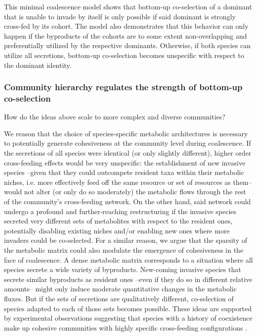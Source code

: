\documentclass[a4paper,10pt]{article}
\begin{document}
This minimal coalescence model shows that
bottom-up co-selection of a dominant that is unable to invade by itself
is only possible if said dominant is strongly cross-fed by its cohort.
The model also demonstrates that this behavior can only happen
if the byproducts of the cohorts are to some extent non-overlapping
and preferentially utilized by the respective dominants.
Otherwise, if both species can utilize all secretions, bottom-up
co-selection becomes unspecific with respect to the dominant identity.

\subsubsection*{Community hierarchy regulates the strength of bottom-up co-selection}

How do the ideas above scale to more complex and diverse communities?

We reason that the choice of species-specific metabolic architectures is necessary to potentially generate
cohesiveness at the community level during coalescence.
If the secretions of all species were identical (or only slightly different),
higher order cross-feeding effects would be very unspecific:
the establishment of new invasive species
--given that they could outcompete resident taxa within their metabolic niches,
i.e. more effectively feed off the same resource or set of resources as them--
would not alter (or only do so moderately)
the metabolic flows through the rest of the community's cross-feeding network.
On the other hand, said network could undergo a profound and further-reaching restructuring
if the invasive species secreted very different sets of metabolites with respect to the resident ones,
potentially disabling existing niches and/or enabling new ones
where more invaders could be co-selected.
For a similar reason, we argue that the sparsity of the metabolic matrix could also modulate
the emergence of cohesiveness in the face of coalescence.
A dense metabolic matrix corresponds to a situation where all species secrete a wide
variety of byproducts.
New-coming invasive species that secrete similar byproducts as resident ones
--even if they do so in different relative amounts--
might only induce moderate quantitative changes in the metabolic fluxes.
But if the sets of secretions are qualitatively different, co-selection of species adapted to
each of those sets becomes possible.
These ideas are supported by experimental observations
suggesting that species with a history of coexistence make up
cohesive communities with highly specific cross-feeding configurations
\cite{Rosenzweig1994,Goldford2018,Estrela2020}.
\end{document}
